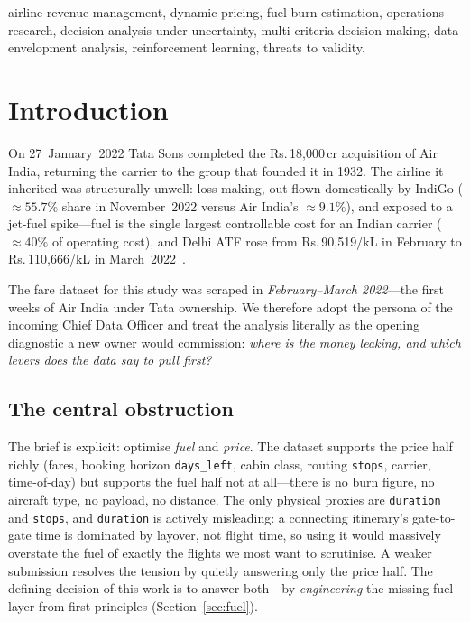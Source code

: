 \documentclass[conference]{IEEEtran}
\newcommand{\INR}{\mbox{Rs.}}
\newcommand{\cr}{\,cr}        %
\begin{document}
\begin{IEEEkeywords}
airline revenue management, dynamic pricing, fuel-burn estimation, operations research, decision analysis under uncertainty, multi-criteria decision making, data envelopment analysis, reinforcement learning, threats to validity.
\end{IEEEkeywords}

\section{Introduction}
On 27~January~2022 Tata Sons completed the \INR{}\,18{,}000\cr{} acquisition of Air India, returning the carrier to the group that founded it in 1932. The airline it inherited was structurally unwell: loss-making, out-flown domestically by IndiGo ($\approx55.7\%$ share in November~2022 versus Air India's $\approx9.1\%$), and exposed to a jet-fuel spike---fuel is the single largest controllable cost for an Indian carrier ($\approx40\%$ of operating cost), and Delhi ATF rose from \INR{}\,90{,}519/kL in February to \INR{}\,110{,}666/kL in March~2022~\cite{iocl,capa}.

The fare dataset for this study was scraped in \emph{February--March 2022}---the first weeks of Air India under Tata ownership. We therefore adopt the persona of the incoming Chief Data Officer and treat the analysis literally as the opening diagnostic a new owner would commission: \emph{where is the money leaking, and which levers does the data say to pull first?}

\subsection{The central obstruction}
The brief is explicit: optimise \emph{fuel} and \emph{price}. The dataset supports the price half richly (fares, booking horizon \texttt{days\_left}, cabin class, routing \texttt{stops}, carrier, time-of-day) but supports the fuel half not at all---there is no burn figure, no aircraft type, no payload, no distance. The only physical proxies are \texttt{duration} and \texttt{stops}, and \texttt{duration} is actively misleading: a connecting itinerary's gate-to-gate time is dominated by layover, not flight time, so using it would massively overstate the fuel of exactly the flights we most want to scrutinise. A weaker submission resolves the tension by quietly answering only the price half. The defining decision of this work is to answer both---by \emph{engineering} the missing fuel layer from first principles (Section~\ref{sec:fuel}).
\end{document}
